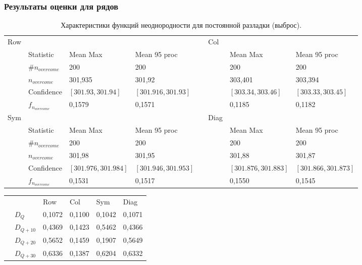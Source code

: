 \documentclass[11pt]{beamer}
\begin{document}
	\begin{frame}
		\frametitle{Результаты оценки для рядов}
		\tiny
		\begin{table}[!hhh]
			\caption{Характеристики функций неоднородности для постоянной разладки (выброс).}
			\begin{tabular}{llllllll}
				Row & 				   & 		  	  & 			 && Col & 		      & 			      \\
				& Statistic        & Mean Max 	  & Mean 95 proc && 	& Mean Max     & Mean 95 proc     \\
				& $\#n_{overcome}$ & 200 	  	  & 200 		 &&     & 200 	      & 200 			  \\
				& $n_{overcome}$   & 301,935   	  & 301,92      &&     & 303,401       & 303,394		  \\
				& Confidence       & $[301.93, 301.94]$& $[301.916, 301.93]$&&     & $[303.34, 303.46]$ & $[303.33, 303.45]$     \\
				&$f_{n_{overcome}}$& 0,1579	  &	0,1571		 &&     & 0,1185  &   0,1182        \\
				Sym & 				   & 		  	  & 			 && Diag& 		      & 			      \\
				& Statistic        & Mean Max 	  & Mean 95 proc && 	& Mean Max     & Mean 95 proc     \\
				& $\#n_{overcome}$ & 200 	  	  & 200 		 &&     & 200 	      & 200 			  \\
				& $n_{overcome}$   & 301,98   	  & 301,95      &&     & 301,88      & 301,87 		  \\
				& Confidence       & $[301.976, 301.984]$ & $[301.946, 301.953]$ &&     & $[301.876, 301.883]$ & $[301.866, 301.873]$     \\
				&$f_{n_{overcome}}$& 0,1531		  &	0,1517		 &&     & 0,1550		 & 0,1545          \\
			\end{tabular}
		\end{table}
		\begin{table}[!hhh]
			\begin{tabular}{llllll}
				&              & Row 	  & Col 	& Sym    & Diag  \\
				& $D_Q$        & 0,1072	  & 0,1100 	& 0,1042 & 0,1071		\\
				& $D_{Q+10}$   & 0,4369   & 0,1423  & 0,5462 & 0,4366	\\
				& $D_{Q+20}$   & 0,5652   & 0,1459  & 0,1907 & 0,5649	\\
				& $D_{Q+30}$   & 0,6336	  &	0,1387	& 0,6204 & 0,6332	
			\end{tabular}
		\end{table}
	\end{frame}
\end{document}
